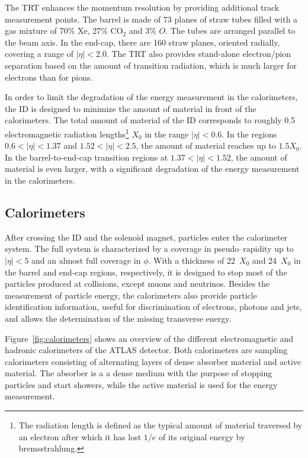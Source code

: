 The TRT enhances the momentum resolution by providing additional track
measurement points.
The barrel is made of 73 planes of straw tubes filled with a gas
mixture of 70\% Xe, 27\% CO$_2$ and 3\% $O$. The tubes
are arranged parallel to the beam axis.
In the end-cap, there are 160 straw planes, oriented radially,
covering a range of \mbox{$|\eta| < 2.0$}. 
The TRT also provides stand-alone electron/pion separation based on
the amount of transition radiation, which is much larger for electrons
than for pions.

In order to limit the degradation of the energy measurement in the
calorimeters, the ID is designed to minimize the amount of material in
front of the calorimeters.
The total amount of material of the ID corresponds to roughly 0.5
electromagnetic radiation lengths\footnote{The radiation length is
  defined as the typical amount of material traversed by an electron
  after which it has lost $1/e$ of its original energy by
  bremsstrahlung.} $X_0$ in the range \mbox{$|\eta| < 0.6$}.
In the regions \mbox{$0.6 < |\eta| < 1.37$} and \mbox{$1.52 < |\eta| <
  2.5$}, the amount of material reaches up to \mbox{$1.5 X_0$}.
In the barrel-to-end-cap transition regions at \mbox{$1.37 < |\eta| <
  1.52$}, the amount of material is even larger, with a significant
degradation of the energy measurement in the calorimeters.

\subsection{Calorimeters}
\label{sec:calorimeter}

After crossing the ID and the solenoid magnet, particles enter the
calorimeter system.
The full system is characterized by a coverage in pseudo--rapidity up to
$|\eta|<5$ and an almost full coverage in $\phi$. With  a thickness of
22~$X_0$ and 24~$X_0$ in the barrel and end-cap regions, respectively, 
it is designed to stop most of the particles produced at collisions,
except muons and neutrinos.
Besides the measurement of particle energy, the calorimeters also
provide particle identification information, useful for discrimination
of electrons, photons and jets, and allows the determination
of the missing transverse energy.

Figure~\ref{fig:calorimeters} shows an overview of the different
electromagnetic  and hadronic calorimeters of the ATLAS detector.
Both calorimeters are sampling calorimeters consisting of alternating
layers of dense absorber material and active material.
The absorber is a a dense medium with the purpose of stopping
particles and start showers, while the active material is used for the
energy measurement.

